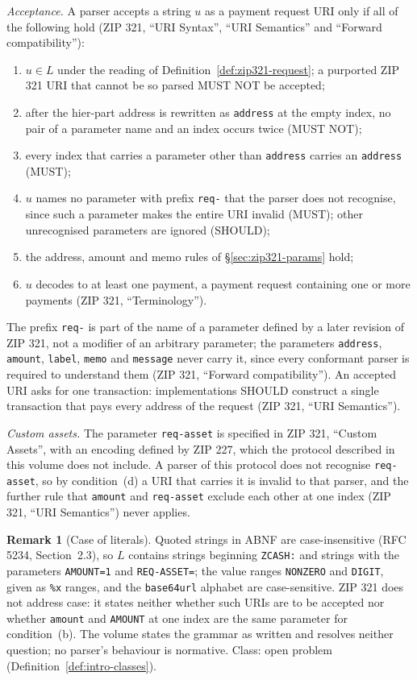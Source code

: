 \documentclass[11pt,a4paper]{article}
\theoremstyle{definition}
\newtheorem{remark}[theorem]{Remark}
\begin{document}
\emph{Acceptance.} A parser accepts a string $u$ as a payment request URI
only if all of the following hold (ZIP 321, ``URI Syntax'', ``URI
Semantics'' and ``Forward compatibility''):
\begin{enumerate}[label=(\alph*)]
\item $u \in L$ under the reading of Definition~\ref{def:zip321-request}; a
  purported ZIP 321 URI that cannot be so parsed MUST NOT be accepted;
\item after the hier-part address is rewritten as \texttt{address} at the
  empty index, no pair of a parameter name and an index occurs twice (MUST
  NOT);
\item every index that carries a parameter other than \texttt{address}
  carries an \texttt{address} (MUST);
\item $u$ names no parameter with prefix \texttt{req-} that the parser does
  not recognise, since such a parameter makes the entire URI invalid (MUST);
  other unrecognised parameters are ignored (SHOULD);
\item the address, amount and memo rules of \S\ref{sec:zip321-params} hold;
\item $u$ decodes to at least one payment, a payment request containing one
  or more payments (ZIP 321, ``Terminology'').
\end{enumerate}
The prefix \texttt{req-} is part of the name of a parameter defined by a
later revision of ZIP 321, not a modifier of an arbitrary parameter; the
parameters \texttt{address}, \texttt{amount}, \texttt{label},
\texttt{memo} and \texttt{message} never carry it, since every conformant
parser is required to understand them (ZIP 321, ``Forward
compatibility''). An accepted URI asks for one transaction: implementations
SHOULD construct a single transaction that pays every address of the
request (ZIP 321, ``URI Semantics'').

\emph{Custom assets.} The parameter \texttt{req-asset} is specified in ZIP
321, ``Custom Assets'', with an encoding defined by ZIP 227, which the
protocol described in this volume does not include. A parser of this
protocol does not recognise \texttt{req-asset}, so by condition~(d) a URI
that carries it is invalid to that parser, and the further rule that
\texttt{amount} and \texttt{req-asset} exclude each other at one index
(ZIP 321, ``URI Semantics'') never applies.

\begin{remark}[Case of literals]\label{rem:zip321-case}
Quoted strings in ABNF are case-insensitive (RFC 5234, Section~2.3), so
$L$ contains strings beginning \texttt{ZCASH:} and strings with the
parameters \texttt{AMOUNT=1} and \texttt{REQ-ASSET=}; the value ranges
\texttt{NONZERO} and \texttt{DIGIT}, given as \texttt{\%x} ranges, and the
\texttt{base64url} alphabet are case-sensitive. ZIP 321 does not address
case: it states neither whether such URIs are to be accepted nor whether
\texttt{amount} and \texttt{AMOUNT} at one index are the same parameter for
condition~(b). The volume states the grammar as written and resolves
neither question; no parser's behaviour is normative. Class: open problem
(Definition~\ref{def:intro-classes}).
\end{remark}
\end{document}
